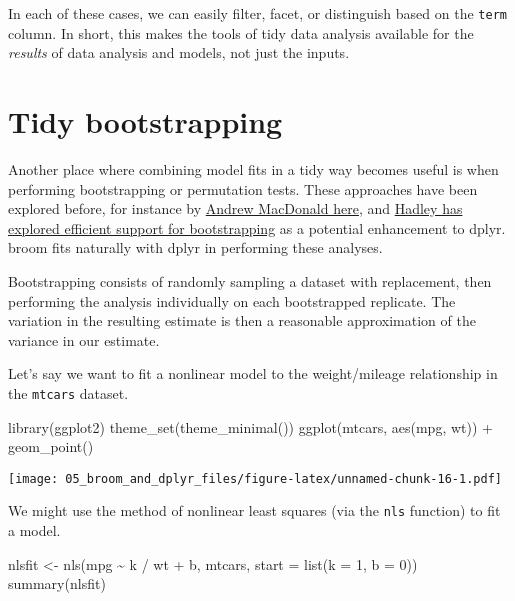 \documentclass[
]{book}
\newenvironment{Shaded}{\begin{snugshade}}{\end{snugshade}}
\newcommand{\AttributeTok}[1]{\textcolor[rgb]{0.77,0.63,0.00}{#1}}
\newcommand{\DecValTok}[1]{\textcolor[rgb]{0.00,0.00,0.81}{#1}}
\newcommand{\FunctionTok}[1]{\textcolor[rgb]{0.00,0.00,0.00}{#1}}
\newcommand{\NormalTok}[1]{#1}
\newcommand{\OtherTok}[1]{\textcolor[rgb]{0.56,0.35,0.01}{#1}}
\newcommand{\SpecialCharTok}[1]{\textcolor[rgb]{0.00,0.00,0.00}{#1}}
\begin{document}
In each of these cases, we can easily filter, facet, or distinguish based on the \texttt{term} column. In short, this makes the tools of tidy data analysis available for the \emph{results} of data analysis and models, not just the inputs.

\hypertarget{tidy-bootstrapping}{%
\section{Tidy bootstrapping}\label{tidy-bootstrapping}}

Another place where combining model fits in a tidy way becomes useful is when performing bootstrapping or permutation tests. These approaches have been explored before, for instance by \href{http://rstudio-pubs-static.s3.amazonaws.com/19698_a4c472606e3c43e4b94720506e49bb7b.html}{Andrew MacDonald here}, and \href{https://github.com/hadley/dplyr/issues/269}{Hadley has explored efficient support for bootstrapping} as a potential enhancement to dplyr. broom fits naturally with dplyr in performing these analyses.

Bootstrapping consists of randomly sampling a dataset with replacement, then performing the analysis individually on each bootstrapped replicate. The variation in the resulting estimate is then a reasonable approximation of the variance in our estimate.

Let's say we want to fit a nonlinear model to the weight/mileage relationship in the \texttt{mtcars} dataset.

\begin{Shaded}
\begin{Highlighting}[]
\FunctionTok{library}\NormalTok{(ggplot2)}
\FunctionTok{theme\_set}\NormalTok{(}\FunctionTok{theme\_minimal}\NormalTok{())}
\FunctionTok{ggplot}\NormalTok{(mtcars, }\FunctionTok{aes}\NormalTok{(mpg, wt)) }\SpecialCharTok{+} 
    \FunctionTok{geom\_point}\NormalTok{()}
\end{Highlighting}
\end{Shaded}

\texttt{[image: 05\_broom\_and\_dplyr\_files/figure-latex/unnamed-chunk-16-1.pdf]}

We might use the method of nonlinear least squares (via the \texttt{nls} function) to fit a model.

\begin{Shaded}
\begin{Highlighting}[]
\NormalTok{nlsfit }\OtherTok{\textless{}{-}} \FunctionTok{nls}\NormalTok{(mpg }\SpecialCharTok{\textasciitilde{}}\NormalTok{ k }\SpecialCharTok{/}\NormalTok{ wt }\SpecialCharTok{+}\NormalTok{ b, mtcars, }\AttributeTok{start =} \FunctionTok{list}\NormalTok{(}\AttributeTok{k =} \DecValTok{1}\NormalTok{, }\AttributeTok{b =} \DecValTok{0}\NormalTok{))}
\FunctionTok{summary}\NormalTok{(nlsfit)}
\end{Highlighting}
\end{Shaded}
\end{document}
